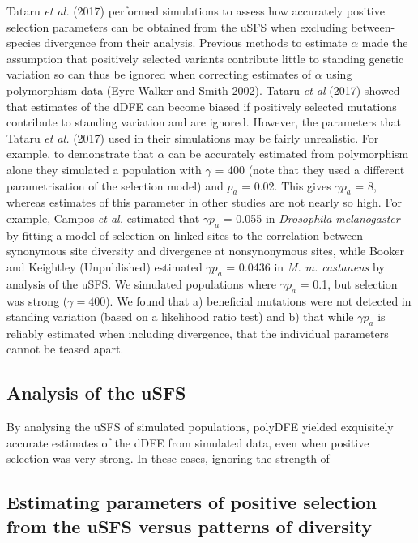 \documentclass[11pt]{article}
\begin{document}
Tataru \textit{et al.} (2017) performed simulations to assess how accurately positive selection parameters can be obtained from the uSFS when excluding between-species divergence from their analysis. Previous methods to estimate $\alpha$ made the assumption that positively selected variants contribute little  to standing genetic variation so can thus be ignored when correcting estimates of $\alpha$ using polymorphism data (Eyre-Walker and Smith 2002). Tataru \textit{et al} (2017) showed  that estimates of the dDFE can become biased if positively selected mutations contribute to standing variation and are ignored. However, the parameters that Tataru \textit{et al.} (2017) used in their simulations may be fairly unrealistic. For example, to demonstrate that $\alpha$ can be accurately estimated from polymorphism alone they simulated a population with $\gamma$ = 400 (note that they used a different parametrisation of the selection model) and $p_a$ = 0.02. This gives $\gamma p_a$ = 8, whereas estimates of this parameter in other studies are not nearly so high. For example, Campos \textit{et al.} estimated that $\gamma p_a$ = 0.055 in \textit{Drosophila melanogaster} by fitting a model of selection on linked sites to the correlation between synonymous site diversity and divergence at nonsynonymous sites, while Booker and Keightley (Unpublished) estimated $\gamma p_a$ = 0.0436 in \textit{M. m. castaneus} by analysis of the uSFS. We simulated populations where $\gamma p_a$ = 0.1, but selection was strong ($\gamma = 400$). We found that a) beneficial mutations were not detected in standing variation (based on a likelihood ratio test) and b) that while $\gamma p_a$ is reliably estimated when including divergence, that the individual parameters cannot be teased apart. 

\subsection{Analysis of the uSFS}

By analysing the uSFS of simulated populations, polyDFE yielded exquisitely accurate estimates of the dDFE from simulated data, even when positive selection was very strong. In these cases, ignoring the strength of 

\subsection*{Estimating parameters of positive selection from the uSFS versus patterns of diversity}
\end{document}
